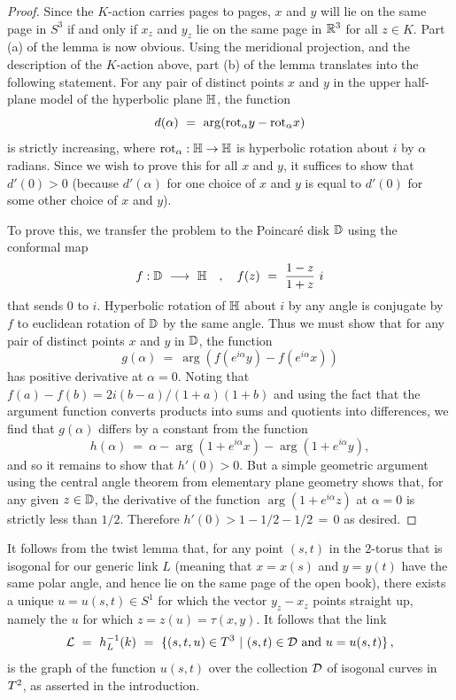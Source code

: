 \begin{proof}
Since the $K$-action carries pages to pages, $x$ and $y$ will lie on the same page in $S^3$ if and only if $x_z$ and $y_z$ lie on the same page in $\mathbb R^3$ for all $z\in K$.  Part (a) of the lemma is now obvious.   Using the meridional projection, and the description of the $K$-action above, part (b) of the lemma translates into the following statement.  For any pair of distinct points $x$ and $y$ in the upper half-plane model of the hyperbolic plane $\mathbb H$, the function 
$$
d(\alpha) \ = \ \arg(\mathrm{rot}_\alpha y-\mathrm{rot}_\alpha x)
$$
is strictly increasing, where $\mathrm{rot}_\alpha:\mathbb H\to\mathbb H$ is hyperbolic rotation about $i$ by $\alpha$ radians.   Since we wish to prove this for all $x$ and $y$, it suffices to show that $d'(0)>0$ (because $d'(\alpha)$ for one choice of $x$ and $y$ is equal to $d'(0)$ for some other choice of $x$ and $y$).    

To prove this, we transfer the problem to the Poincar\'e disk $\mathbb D$ using the conformal map 
$$
f:\mathbb D\ \longrightarrow\ \mathbb H \quad,\quad f(z) \ = \  \frac{1-z}{1+z}\ i
$$
that sends $0$ to $i$.  Hyperbolic rotation of $\mathbb H$ about $i$ by any angle is conjugate by $f$ to euclidean rotation of $\mathbb D$ by the same angle.   Thus we must show that for any pair of distinct points $x$ and $y$ in $\mathbb D$, the function
$$
g(\alpha) \ = \ \arg(f(e^{i\alpha}y)-f(e^{i\alpha}x))
$$
has positive derivative at $\alpha = 0$.   Noting that  $f(a)-f(b) = 2i(b-a)/(1+a)(1+b)$ and using the fact that the argument function converts products into sums and quotients into differences, we find that $g(\alpha)$ differs by a constant from the function 
$$
h(\alpha) \ = \ \alpha - \arg(1+e^{i\alpha}x) - \arg(1+e^{i\alpha}y),
$$  
and so it remains to show that $h'(0)>0$.  But a simple geometric argument using the central angle theorem from elementary plane geometry shows that, for any given $z\in \mathbb D$, the derivative of the function $\arg(1+e^{i\alpha}z)$ at $\alpha = 0$ is strictly less than $1/2$.  Therefore $h'(0) > 1 - 1/2-1/2 \, = \, 0$ as desired.
\end{proof}

It follows from the twist lemma that, for any point $(s,t)$ in the $2$-torus that is isogonal for our generic link $L$ (meaning that  $x=x(s)$ and $y=y(t)$ have the same polar angle, and hence lie on the same page of the open book),  there exists a unique $u = u(s,t)\in S^1$ for which the vector $y_z-x_z$ points straight up, namely the $u$ for which $z = z(u) = \tau(x,y)$.   It follows that the link
$$
\bl \ = \ h_L^{-1}(k) \ = \ \{(s,t,u)\in\tor \st (s,t)\in\cald \text{ and } u=u(s,t)\}\,, \label{pontryaginlink}
$$
is the graph of the function $u(s,t)$ over the collection $\mathcal D$ of isogonal curves in $T^2$, as asserted in the introduction.  

